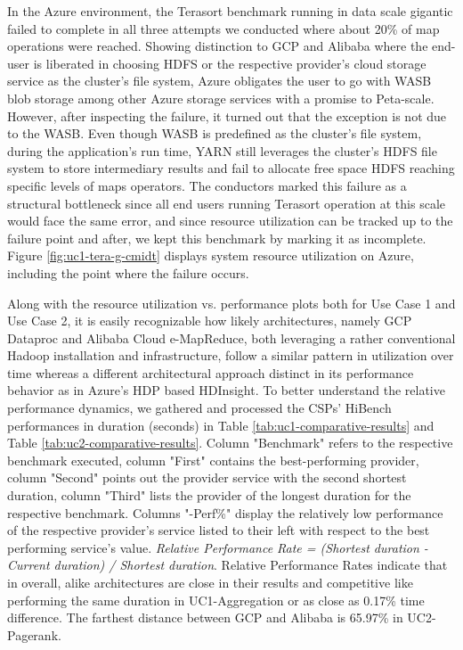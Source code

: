 \documentclass[review]{elsarticle}
\begin{document}
In the Azure environment, the Terasort benchmark running in data scale gigantic failed to complete in all three attempts we conducted where about 20\% of map operations were reached. Showing distinction to GCP and Alibaba where the end-user is liberated in choosing HDFS or the respective provider's cloud storage service as the cluster's file system, Azure obligates the user to go with WASB blob storage among other Azure storage services with a promise to Peta-scale. However, after inspecting the failure, it turned out that the exception is not due to the WASB. Even though WASB is predefined as the cluster's file system, during the application's run time, YARN still leverages the cluster's HDFS file system to store intermediary results and fail to allocate free space HDFS reaching specific levels of maps operators. The conductors marked this failure as a structural bottleneck since all end users running Terasort operation at this scale would face the same error, and since resource utilization can be tracked up to the failure point and after, we kept this benchmark by marking it as incomplete. Figure \ref{fig:uc1-tera-g-cmidt} displays system resource utilization on Azure, including the point where the failure occurs.

Along with the resource utilization vs. performance plots both for Use Case 1 and Use Case 2, it is easily recognizable how likely architectures, namely GCP Dataproc and Alibaba Cloud e-MapReduce, both leveraging a rather conventional Hadoop installation and infrastructure, follow a similar pattern in utilization over time whereas a different architectural approach distinct in its performance behavior as in Azure's HDP based HDInsight. To better understand the relative performance dynamics, we gathered and processed the CSPs' HiBench performances in duration (seconds) in Table \ref{tab:uc1-comparative-results} and Table \ref{tab:uc2-comparative-results}. Column "Benchmark" refers to the respective benchmark executed, column "First" contains the best-performing provider, column "Second" points out the provider service with the second shortest duration, column "Third" lists the provider of the longest duration for the respective benchmark. Columns "-Perf\%" display the relatively low performance of the respective provider's service listed to their left with respect to the best performing service's value. \textit{Relative Performance Rate = (Shortest duration - Current duration) / Shortest duration}. Relative Performance Rates indicate that in overall, alike architectures are close in their results and competitive like performing the same duration in UC1-Aggregation or as close as 0.17\% time difference. The farthest distance between GCP and Alibaba is 65.97\% in UC2-Pagerank.
\end{document}
